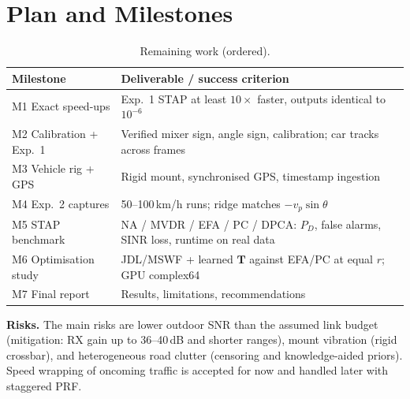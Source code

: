 \documentclass[conference]{IEEEtran}
\newcommand{\vect}[1]{\mathbf{#1}}
\begin{document}
\section{Plan and Milestones}
\begin{table}[h]
\centering
\caption{Remaining work (ordered).}
\label{tab:plan}
\setlength{\tabcolsep}{3pt}
\begin{tabular}{p{}p{}}
\toprule
Milestone & Deliverable / success criterion\\
\midrule
M1 Exact speed-ups & Exp.~1 STAP at least $10\times$ faster, outputs identical to $10^{-6}$\\
M2 Calibration + Exp.~1 & Verified mixer sign, angle sign, calibration; car tracks across frames\\
M3 Vehicle rig + GPS & Rigid mount, synchronised GPS, timestamp ingestion\\
M4 Exp.~2 captures & 50--100\,km/h runs; ridge matches $-v_p\sin\theta$\\
M5 STAP benchmark & NA / MVDR / EFA / PC / DPCA: $P_D$, false alarms, SINR loss, runtime on real data\\
M6 Optimisation study & JDL/MSWF + learned $\vect T$ against EFA/PC at equal $r$; GPU complex64\\
M7 Final report & Results, limitations, recommendations\\
\bottomrule
\end{tabular}
\end{table}

\textbf{Risks.} The main risks are lower outdoor SNR than the assumed link budget (mitigation:
RX gain up to 36--40\,dB and shorter ranges), mount vibration (rigid crossbar), and
heterogeneous road clutter (censoring and knowledge-aided priors). Speed wrapping of oncoming
traffic is accepted for now and handled later with staggered PRF.
\end{document}
